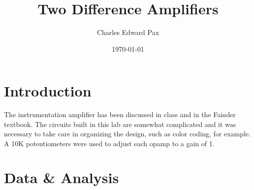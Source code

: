 \documentclass[11pt,onecolumn]{article}
\begin{document}
\title{Two Difference Amplifiers}
\date{\today}
\author{Charles Edward Pax}
\maketitle


\section{Introduction}\label{sec:Introduction}
The instrumentation amplifier has been discussed in class and in the Faissler textbook. The circuits built in this lab are somewhat complicated and it was necessary to take care in organizing the design, such as color coding, for example. A 10K potentiometers were used to adjust each opamp to a gain of 1.

\section{Data \& Analysis}\label{sec:DataAndAnalysis}
\end{document}
